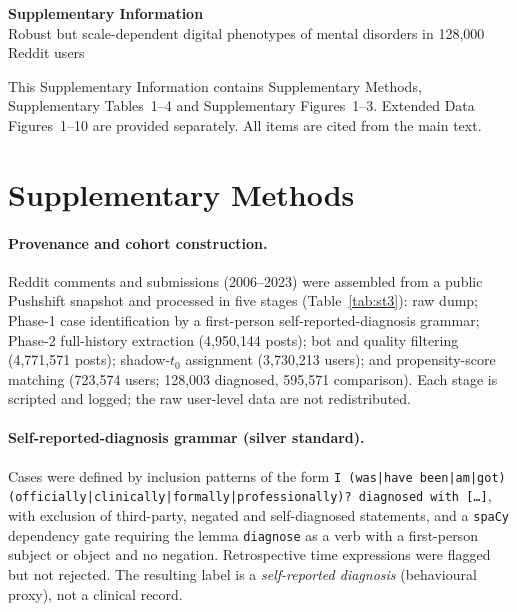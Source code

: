\documentclass[11pt]{article}
\begin{document}
\begin{center}
{\LARGE\bfseries Supplementary Information}\\[6pt]
{\large Robust but scale-dependent digital phenotypes of mental disorders in 128{,}000 Reddit
users}
\end{center}

\vspace{0.6em}
\noindent This Supplementary Information contains Supplementary Methods, Supplementary
Tables~1--4 and Supplementary Figures~1--3. Extended Data Figures~1--10 are provided
separately. All items are cited from the main text.

\tableofcontents

\section*{Supplementary Methods}

\paragraph*{Provenance and cohort construction.}
Reddit comments and submissions (2006--2023) were assembled from a public Pushshift snapshot and
processed in five stages (Table~\ref{tab:st3}): raw dump; Phase-1 case identification by a
first-person self-reported-diagnosis grammar; Phase-2 full-history extraction (4{,}950{,}144
posts); bot and quality filtering (4{,}771{,}571 posts); shadow-$t_0$ assignment (3{,}730{,}213
users); and propensity-score matching (723{,}574 users; 128{,}003 diagnosed, 595{,}571
comparison). Each stage is scripted and logged; the raw user-level data are not redistributed.

\paragraph*{Self-reported-diagnosis grammar (silver standard).}
Cases were defined by inclusion patterns of the form
\texttt{I (was|have been|am|got) (officially|clinically|formally|professionally)? diagnosed with
[\ldots]}, with exclusion of third-party, negated and self-diagnosed statements, and a
\texttt{spaCy} dependency gate requiring the lemma \texttt{diagnose} as a verb with a
first-person subject or object and no negation. Retrospective time expressions were flagged but
not rejected. The resulting label is a \emph{self-reported diagnosis} (behavioural proxy), not a
clinical record.
\end{document}

